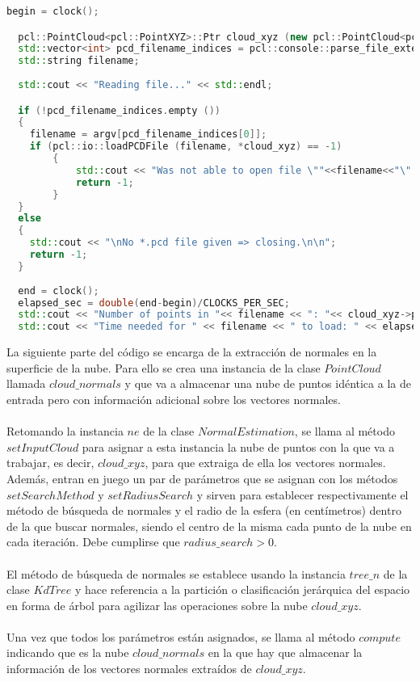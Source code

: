 \begin{lstlisting}[language=C++,breaklines]
  begin = clock();

  pcl::PointCloud<pcl::PointXYZ>::Ptr cloud_xyz (new pcl::PointCloud<pcl::PointXYZ>);
  std::vector<int> pcd_filename_indices = pcl::console::parse_file_extension_argument (argc, argv, "pcd"); 
  std::string filename;
     
  std::cout << "Reading file..." << std::endl;

  if (!pcd_filename_indices.empty ())
  {
  	filename = argv[pcd_filename_indices[0]];
  	if (pcl::io::loadPCDFile (filename, *cloud_xyz) == -1) 
    	{
        	std::cout << "Was not able to open file \""<<filename<<"\".\n";
       		return -1;
    	}
  }
  else
  {
  	std::cout << "\nNo *.pcd file given => closing.\n\n";
  	return -1;
  }
  
  end = clock();
  elapsed_sec = double(end-begin)/CLOCKS_PER_SEC;
  std::cout << "Number of points in "<< filename << ": "<< cloud_xyz->points.size () <<std::endl; 
  std::cout << "Time needed for " << filename << " to load: " << elapsed_sec << " seconds"<< std::endl << std::endl; 
\end{lstlisting}
  
  
La siguiente parte del código se encarga de la extracción de normales en la superficie de la nube\cite{normal}. Para ello se crea una instancia de la clase $PointCloud$ llamada $cloud\_normals$ y que va a almacenar una nube de puntos idéntica a la de entrada pero con información adicional sobre los vectores normales.
\\
\\
Retomando la instancia $ne$ de la clase $NormalEstimation$, se llama al método $setInputCloud$ para asignar a esta instancia la nube de puntos con la que va a trabajar, es decir, $cloud\_xyz$, para que extraiga de ella los vectores normales.
Además, entran en juego un par de parámetros que se asignan con los métodos $setSearchMethod$ y $setRadiusSearch$ y sirven para establecer respectivamente el método de búsqueda de normales y el radio de la esfera (en centímetros) dentro de la que buscar normales, siendo el centro de la misma cada punto de la nube en cada iteración. Debe cumplirse que $radius\_search>0.$
\\
\\
El método de búsqueda de normales se establece usando la instancia $tree\_n$ de la clase $KdTree$ y hace referencia a la partición o clasificación jerárquica del espacio en forma de árbol para agilizar las operaciones sobre la nube $cloud\_xyz$.
\\
\\
Una vez que todos los parámetros están asignados, se llama al método $compute$ indicando que es la nube $cloud\_normals$ en la que hay que almacenar la información de los vectores normales extraídos de $cloud\_xyz$.

